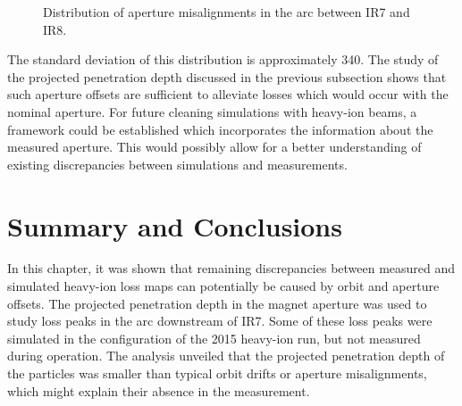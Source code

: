 \begin{figure}[t]
  \centering
  \caption{Distribution of aperture misalignments in the arc between IR7 and IR8.}  
  \label{pic:16083001}
  \end{figure}

The standard deviation of this distribution is approximately 340\mum. The study of the projected penetration depth discussed in the previous subsection shows that such aperture offsets are sufficient to alleviate losses which would occur with the nominal aperture. For future cleaning simulations with heavy-ion beams, a framework could be established which incorporates the information about the measured aperture. This would possibly allow for a better understanding of existing discrepancies between simulations and measurements.

\section{Summary and Conclusions}

In this chapter, it was shown that remaining discrepancies between measured and simulated heavy-ion loss maps can potentially be caused by orbit and aperture offsets. The projected penetration depth in the magnet aperture was used to study loss peaks in the arc downstream of IR7. Some of these loss peaks were simulated in the configuration of the 2015 heavy-ion run, but not measured during operation. The analysis unveiled that the projected penetration depth of the particles was smaller than typical orbit drifts or aperture misalignments, which might explain their absence in the measurement. 

